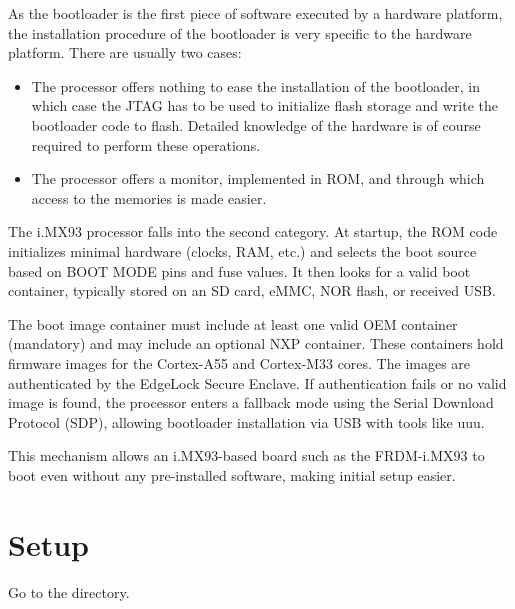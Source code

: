 
As the bootloader is the first piece of software executed by a
hardware platform, the installation procedure of the bootloader is
very specific to the hardware platform. There are usually two cases:

\begin{itemize}

\item The processor offers nothing to ease the installation of the
  bootloader, in which case the JTAG has to be used to initialize
  flash storage and write the bootloader code to flash. Detailed
  knowledge of the hardware is of course required to perform these
  operations.

\item The processor offers a monitor, implemented in ROM, and through
  which access to the memories is made easier.

\end{itemize}

The i.MX93 processor falls into the second category. At startup, the ROM code
initializes minimal hardware (clocks, RAM, etc.) and selects the boot source
based on BOOT MODE pins and fuse values. It then looks for a valid boot 
container, typically stored on an SD card, eMMC, NOR flash, or received 
USB.

The boot image container must include at least one valid OEM container
(mandatory) and may include an optional NXP container. These containers hold
firmware images for the Cortex-A55 and Cortex-M33 cores. The images are
authenticated by the EdgeLock Secure Enclave. If authentication fails or no
valid image is found, the processor enters a fallback mode using the Serial
Download Protocol (SDP), allowing bootloader installation via USB with tools
like uuu.

This mechanism allows an i.MX93-based board such as the FRDM-i.MX93 to boot
even without any pre-installed software, making initial setup easier.

\section{Setup}

Go to the  directory.


